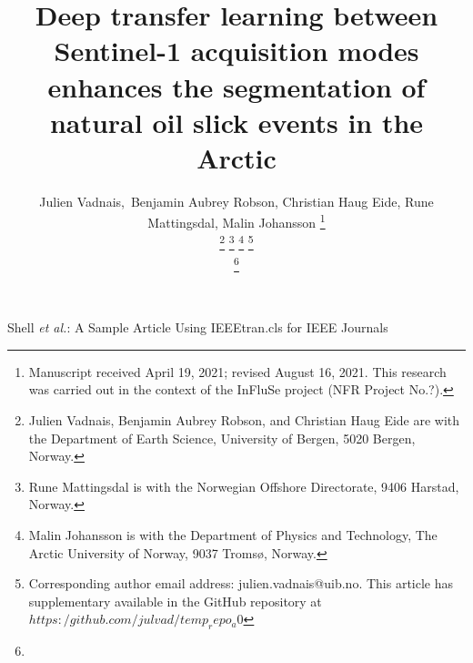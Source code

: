 \documentclass[journal]{IEEEtran}
\begin{document}
\title{Deep transfer learning between Sentinel-1 acquisition modes enhances the segmentation of natural oil slick events in the Arctic}

\author{Julien Vadnais,~Benjamin Aubrey Robson, Christian Haug Eide, Rune Mattingsdal, Malin Johansson
\thanks{Manuscript received April 19, 2021; revised August 16, 2021. This research was carried out in the context of the InFluSe project (NFR Project No.?).}


\thanks{Julien Vadnais, Benjamin Aubrey Robson, and Christian Haug Eide are with the Department of Earth Science, University of Bergen, 5020 Bergen, Norway.}
\thanks{Rune Mattingsdal is with the Norwegian Offshore Directorate, 9406 Harstad, Norway.}
\thanks{Malin Johansson is with the Department of Physics and Technology, The Arctic University of Norway, 9037 Tromsø, Norway.}
\thanks{Corresponding author email address: julien.vadnais@uib.no. This article has supplementary available in the GitHub repository at $https:/github.com/julvad/temp_repo_a0$}

\thanks{}%
}

%
{Shell \MakeLowercase{\textit{et al.}}: A Sample Article Using IEEEtran.cls for IEEE Journals}


\maketitle
\end{document}
